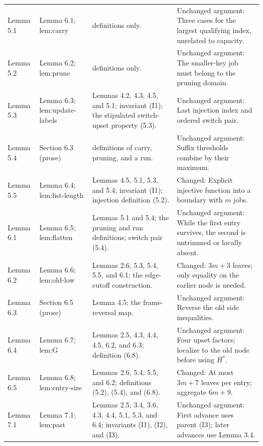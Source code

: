 {\begin{longtable}{@{}L{2.6cm}L{3.2cm}L{3.7cm}L{5.1cm}@{}}
Lemma 5.1 & Lemma 6.1; \textsf{lem:\allowbreak carry} & definitions only. & Unchanged argument: Three cases for the largest qualifying index, unrelated to capacity.\\[3pt]
Lemma 5.2 & Lemma 6.2; \textsf{lem:\allowbreak prune} & definitions only. & Unchanged argument: The smaller-key job must belong to the pruning domain.\\[3pt]
Lemma 5.3 & Lemma 6.3; \textsf{lem:\allowbreak update-\allowbreak labels} & Lemmas 4.2, 4.3, 4.5, and 5.1; invariant (I1); the stipulated switch-upset property (5.3). & Unchanged argument: Last injection index and ordered switch pair.\\[3pt]
Lemma 5.4 & Section 6.3 (prose) & definitions of carry, pruning, and a run. & Unchanged argument: Suffix thresholds combine by their maximum.\\[3pt]
Lemma 5.5 & Lemma 6.4; \textsf{lem:\allowbreak list-\allowbreak length} & Lemmas 4.5, 5.1, 5.3, and 5.4; invariant (I1); injection definition (5.2). & Changed: Explicit injective function into a boundary with \(m\) jobs.\\[3pt]
Lemma 6.1 & Lemma 6.5; \textsf{lem:\allowbreak flatten} & Lemmas 5.1 and 5.4; the pruning and run definitions; switch pair (5.4). & Unchanged argument: While the first entry survives, the second is untrimmed or locally absent.\\[3pt]
Lemma 6.2 & Lemma 6.6; \textsf{lem:\allowbreak old-\allowbreak low} & Lemmas 2.6, 5.3, 5.4, 5.5, and 6.1; the edge-cutoff construction. & Changed: \(3m+3\) leaves; only equality on the earlier node is needed.\\[3pt]
Lemma 6.3 & Section 6.5 (prose) & Lemma 4.5; the frame-reversal map. & Unchanged argument: Reverse the old side inequalities.\\[3pt]
Lemma 6.4 & Lemma 6.7; \textsf{lem:\allowbreak G} & Lemmas 2.5, 4.3, 4.4, 4.5, 6.2, and 6.3; definition (6.8). & Unchanged argument: Four upset factors; localize to the old node before using \(H^*\).\\[3pt]
Lemma 6.5 & Lemma 6.8; \textsf{lem:\allowbreak entry-\allowbreak size} & Lemmas 2.6, 5.4, 5.5, and 6.2; definitions (5.2), (5.4), and (6.8). & Changed: At most \(3m+7\) leaves per entry; aggregate \(6m+9\).\\[3pt]
Lemma 7.1 & Lemma 7.1; \textsf{lem:\allowbreak past} & Lemmas 2.5, 3.4, 3.6, 4.3, 4.4, 5.1, 5.3, and 6.4; invariants (I1), (I2), and (I3). & Unchanged argument: First advance uses parent (I3); later advances use Lemma 3.4.\\[3pt]

\end{longtable}}
